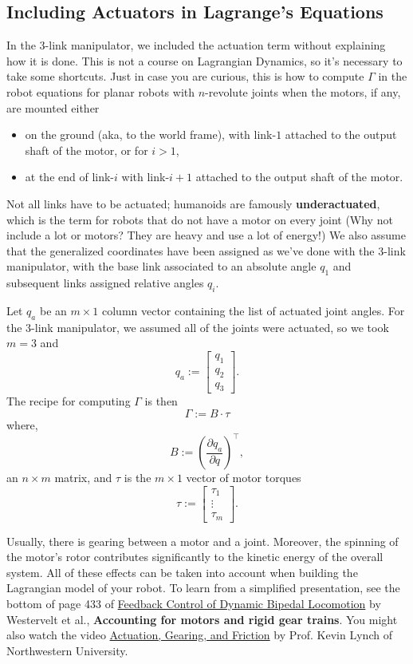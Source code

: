 \subsection{Including Actuators in Lagrange's Equations}

In the 3-link manipulator, we included the actuation term without explaining how it is done. This is not a course on Lagrangian Dynamics, so it's necessary to take some shortcuts. Just in case you are curious, this is how to compute $\Gamma$ in the robot equations for planar robots with $n$-revolute joints when the motors, if any, are mounted either
\begin{itemize}
    \item on the ground (aka, to the world frame), with link-$1$ attached to the output shaft of the motor, or for $i>1$,
    \item at the end of link-$i$ with link-$i+1$ attached to the output shaft of the motor. 
\end{itemize}
Not all links have to be actuated; humanoids are famously \textbf{underactuated}, which is the term for robots that do not have a motor on every joint (Why not include a lot or motors? They are heavy and use a lot of energy!) We also assume that the generalized coordinates have been assigned as we've done with the 3-link manipulator, with the base link associated to an absolute angle $q_1$ and subsequent links assigned relative angles $q_i$.

Let $q_a$ be an $m \times 1$ column vector containing the list of actuated joint angles. For the 3-link manipulator, we assumed all of the joints were actuated, so we took $m=3$ and
$$q_a := \left[ \begin{array}{c} q_1 \\  q_2 \\ q_3 \end{array} \right].$$
The recipe for computing $\Gamma$ is then
$$ \Gamma := B \cdot \tau$$
where,
$$B:=\left( \frac{ \partial q_a}{\partial q} \right)^\top, $$
an $n \times m$ matrix, and $\tau$ is the $m \times 1$ vector of motor torques
$$\tau := \left[ \begin{array}{c} \tau_1 \\  \vdots \\ \tau_m \end{array} \right].$$

Usually, there is gearing between a motor and a joint. Moreover, the spinning of the motor's rotor contributes significantly to the kinetic energy of the overall system. All of these effects can be taken into account when building the Lagrangian model of your robot. To learn from a simplified presentation, see the bottom of page 433 of \href{https://grizzle.robotics.umich.edu/files/Westervelt_biped_control_book_15_May_2007.pdf}{Feedback Control of Dynamic Bipedal Locomotion} by Westervelt et al., \textbf{Accounting for motors and rigid gear trains}. You might also watch the video \href{https://modernrobotics.northwestern.edu/nu-gm-book-resource/8-9-actuation-gearing-and-friction/}{Actuation, Gearing, and Friction} by Prof. Kevin Lynch of Northwestern University.





